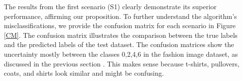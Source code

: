 \begin{table}[h]
\centering
\caption{\footnotesize Accuracy, Precision, Recall and F1 Score of the classification problem in each scenario.}
\centering
\label{3scenarios}
\end{table}
\vspace{-.22cm}
The results from the first scenario (S1) clearly demonstrate its superior performance, affirming our proposition. To further understand the algorithm's misclassifications, we provide the confusion matrix for each scenario in Figure \ref{CM}. The confusion matrix illustrates the comparison between the true labels and the predicted labels of the test dataset. The confusion matrices show the uncertainty mostly between the classes 0,2,4,6 in the fashion image dataset, as discussed in the previous section . This makes sense because t-shirts, pullovers, coats, and shirts look similar and might be confusing.
 

